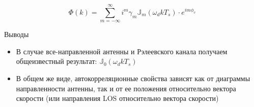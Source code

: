 \documentclass[utf8]{beamer}
\begin{document}
\begin{frame}
$$
\Phi(k) = \sum_{m=-\infty}^{\infty} i^m \gamma_m \mathbb{J}_m (\omega_d k T_s)\cdot e^{im \phi_v}
$$
\begin{block}{Выводы}
\begin{itemize}
        \item В случае все-направленной антенны и Рэлеевского канала получаем общеизвестный результат: $\mathbb{J}_0 (\omega_d k T_s)$
        \item В общем же виде, автокорреляционные свойства зависят как от диаграммы направленности антенны, так и от ее положения относительно вектора скорости (или направления LOS относительно вектора скорости)
\end{itemize}
\end{block}
\end{frame}
\end{document}
